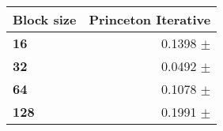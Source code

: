\begin{tabular}{lr}\toprule
\textbf{Block size}  & \textbf{Princeton Iterative}\\\midrule
\textbf{16}  & 0.1398 $\pm$ \\
\textbf{32}  & 0.0492 $\pm$ \\
\textbf{64}  & 0.1078 $\pm$ \\
\textbf{128} & 0.1991 $\pm$ \\
\bottomrule
\end{tabular}
